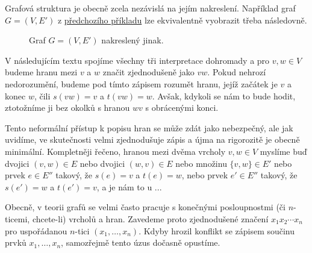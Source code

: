 \begin{warning}
 Grafová struktura je obecně zcela nezávislá na jejím nakreslení. Například graf
 $G = (V,E')$ z \hyperref[exam:interpretace-grafu]{předchozího příkladu} lze
 ekvivalentně vyobrazit třeba následovně.
 \begin{figure}[H]
  \centering
  \caption{Graf $G = (V,E')$ nakreslený jinak.}
  \label{fig:graf-podruhe}
 \end{figure}

\end{warning}

V následujícím textu spojíme všechny tři interpretace dohromady a pro $v,w \in
V$ budeme hranu mezi $v$ a $w$ značit zjednodušeně jako $vw$. Pokud nehrozí
nedorozumění, budeme pod tímto zápisem rozumět hranu, jejíž začátek je $v$ a
konec $w$, čili $s(vw) = v$ a $t(vw) = w$. Avšak, kdykoli se nám to bude hodit,
ztotožníme ji bez okolků s hranou $wv$ s obrácenými konci.

Tento neformální přístup k popisu hran se může zdát jako nebezpečný, ale jak
uvidíme, ve skutečnosti velmi zjednodušuje zápis a újma na rigorozitě je obecně
minimální. Kompletněji řečeno, hranou mezi dvěma vrcholy ${v,w \in V}$ myslíme
buď dvojici $(v,w) \in E$ nebo dvojici $(w,v) \in E$ nebo množinu $\{v,w\} \in
E'$ nebo prvek $e \in E''$ takový, že $s(e) = v$ a $t(e) = w$, nebo prvek $e'
\in E''$ takový, že $s(e') = w$ a $t(e') = v$, a je nám to u ...

Obecně, v teorii grafů se velmi často pracuje s konečnými posloupnostmi (či
$n$-ticemi, chcete-li) vrcholů a hran. Zavedeme proto zjednodušené značení
$x_1x_2\cdots x_n$ pro uspořádanou $n$-tici $(x_1,\ldots,x_n)$. Kdyby hrozil
konflikt se zápisem součinu prvků $x_1,\ldots,x_n$, samozřejmě tento úzus
dočasně opustíme.




